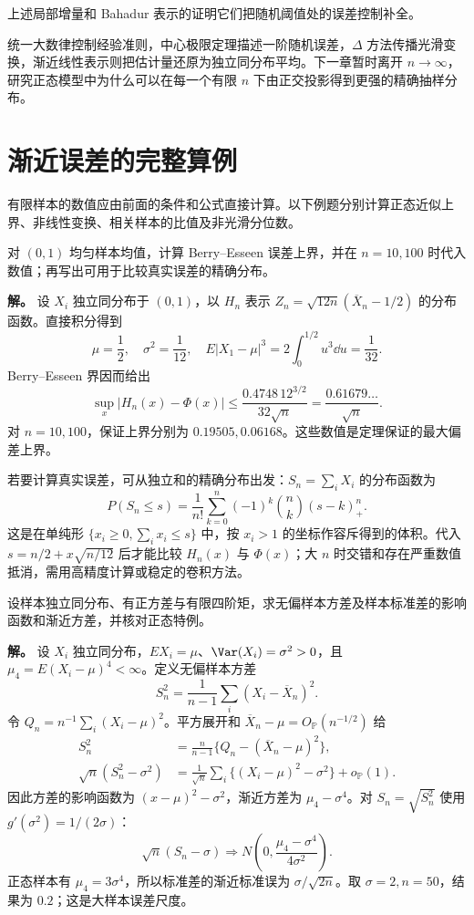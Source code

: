 上述局部增量和 Bahadur 表示的证明它们把随机阈值处的误差控制补全。

统一大数律控制经验准则，中心极限定理描述一阶随机误差，$\Delta$ 方法传播光滑变换，渐近线性表示则把估计量还原为独立同分布平均。下一章暂时离开 $n\to\infty$，研究正态模型中为什么可以在每一个有限 $n$ 下由正交投影得到更强的精确抽样分布。

\section{渐近误差的完整算例}\label{sec:clt-examples}

有限样本的数值应由前面的条件和公式直接计算。以下例题分别计算正态近似上界、非线性变换、相关样本的比值及非光滑分位数。

\begin{exbox}[均匀分布的正态近似上界]
对 $(0,1)$ 均匀样本均值，计算 Berry--Esseen 误差上界，并在 $n=10,100$ 时代入数值；再写出可用于比较真实误差的精确分布。

\textbf{解。} 设 $X_i$ 独立同分布于 $(0,1)$，以 $H_n$ 表示 $Z_n=\sqrt{12n}(\overline X_n-1/2)$ 的分布函数。直接积分得到
\[
 \mu=\frac12,\quad \sigma^2=\frac1{12},\quad
 E|X_1-\mu|^3=2\int_0^{1/2}u^3\dd u=\frac1{32}.
\]
Berry--Esseen 界因而给出
\[
 \sup_x|H_n(x)-\Phi(x)|
 \le\frac{0.4748\,12^{3/2}}{32\sqrt n}
 =\frac{0.61679\ldots}{\sqrt n}.
\]
对 $n=10,100$，保证上界分别为 $0.19505,0.06168$。这些数值是定理保证的最大偏差上界。

若要计算真实误差，可从独立和的精确分布出发：$S_n=\sum_iX_i$ 的分布函数为
\[
 P(S_n\le s)=\frac1{n!}\sum_{k=0}^n(-1)^k\binom nk(s-k)_+^n.
\]
这是在单纯形 $\{x_i\ge0,\sum_ix_i\le s\}$ 中，按 $x_i>1$ 的坐标作容斥得到的体积。代入 $s=n/2+x\sqrt{n/12}$ 后才能比较 $H_n(x)$ 与 $\Phi(x)$；大 $n$ 时交错和存在严重数值抵消，需用高精度计算或稳定的卷积方法。
\end{exbox}

\begin{exbox}[样本方差与标准差的影响函数]
设样本独立同分布、有正方差与有限四阶矩，求无偏样本方差及样本标准差的影响函数和渐近方差，并核对正态特例。

\textbf{解。} 设 $X_i$ 独立同分布，$EX_i=\mu$、$\Var(X_i)=\sigma^2>0$，且 $\mu_4=E(X_i-\mu)^4<\infty$。定义无偏样本方差
\[
 S_n^2=\frac1{n-1}\sum_i(X_i-\overline X_n)^2.
\]
令 $Q_n=n^{-1}\sum_i(X_i-\mu)^2$。平方展开和 $\overline X_n-\mu=O_{\mathbb P}(n^{-1/2})$ 给
\begin{align*}
 S_n^2&=\frac n{n-1}\{Q_n-(\overline X_n-\mu)^2\},\\
 \sqrt n(S_n^2-\sigma^2)
 &=\frac1{\sqrt n}\sum_i\{(X_i-\mu)^2-\sigma^2\}+o_{\mathbb P}(1).
\end{align*}
因此方差的影响函数为 $(x-\mu)^2-\sigma^2$，渐近方差为 $\mu_4-\sigma^4$。对 $S_n=\sqrt{S_n^2}$ 使用 $g'(\sigma^2)=1/(2\sigma)$：
\[
 \sqrt n(S_n-\sigma)\Rightarrow
 N\!\left(0,\frac{\mu_4-\sigma^4}{4\sigma^2}\right).
\]
正态样本有 $\mu_4=3\sigma^4$，所以标准差的渐近标准误为 $\sigma/\sqrt{2n}$。取 $\sigma=2,n=50$，结果为 $0.2$；这是大样本误差尺度。
\end{exbox}

